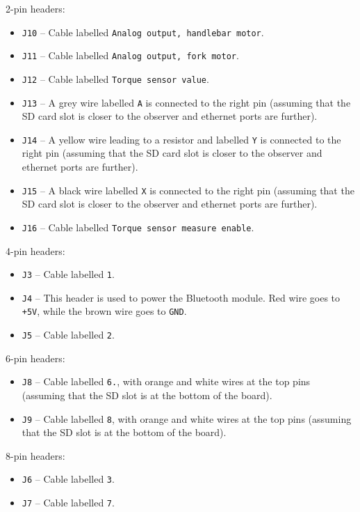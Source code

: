 2-pin headers:
\begin{itemize}[noitemsep]
  \item \verb|J10| -- Cable labelled \verb|Analog output, handlebar motor|.
  \item \verb|J11| -- Cable labelled \verb|Analog output, fork motor|.
  \item \verb|J12| -- Cable labelled \verb|Torque sensor value|.
  \item \verb|J13| -- A grey wire labelled \verb|A| is connected to the right pin (assuming that the SD card slot is closer to the observer and ethernet ports are further).
  \item \verb|J14| -- A yellow wire leading to a resistor and labelled \verb|Y| is connected to the right pin (assuming that the SD card slot is closer to the observer and ethernet ports are further).
  \item \verb|J15| -- A black wire labelled \verb|X| is connected to the right pin (assuming that the SD card slot is closer to the observer and ethernet ports are further).
  \item \verb|J16| -- Cable labelled \verb|Torque sensor measure enable|.
\end{itemize}

4-pin headers:
\begin{itemize}[noitemsep]
  \item \verb|J3| -- Cable labelled \verb|1|.
  \item \verb|J4| -- This header is used to power the Bluetooth module. Red wire goes to \verb|+5V|, while the brown wire goes to \verb|GND|.
  \item \verb|J5| -- Cable labelled \verb|2|.
\end{itemize}

6-pin headers:
\begin{itemize}[noitemsep]
  \item \verb|J8| -- Cable labelled \verb|6.|, with orange and white wires at the top pins (assuming that the SD slot is at the bottom of the board).
  \item \verb|J9| -- Cable labelled \verb|8|, with orange and white wires at the top pins (assuming that the SD slot is at the bottom of the board).
\end{itemize}

8-pin headers:
\begin{itemize}[noitemsep]
  \item \verb|J6| -- Cable labelled \verb|3|.
  \item \verb|J7| -- Cable labelled \verb|7|.
\end{itemize}

